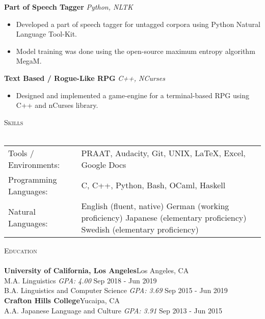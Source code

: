 \documentclass[]{article}
\newcommand{\lineunder} {
    \vspace*{-8pt} \\
    \hspace*{-18pt} \hrulefill \\
}
\newcommand{\header} [1] {
    {\hspace*{-18pt}\vspace*{6pt} \textsc{#1}}
    \vspace*{-6pt} \lineunder
}
\begin{document}
{\textbf{Part of Speech Tagger}} \hspace*{5mm} {\sl Python, NLTK} \\
\vspace*{-5pt}\begin{itemize}	\itemsep 0pt
	\item Developed a part of speech tagger for untagged corpora using Python Natural Language Tool-Kit.
	\item Model training was done using the open-source maximum entropy algorithm MegaM.
\end{itemize}
\vspace*{0mm}
{\textbf{Text Based / Rogue-Like RPG}} \hspace*{5mm} {\sl C++, NCurses} \\
\vspace*{-5pt}\begin{itemize}	\itemsep 0pt
	\item Designed and implemented a game-engine for a terminal-based RPG using C++ and nCurses library.
\end{itemize}
\vspace*{0mm}

\header{Skills}
\begin{tabular}{ l p{11.2cm} }
	Tools / Environments:  & PRAAT, Audacity, Git, UNIX, \LaTeX, Excel, Google Docs
	\\
	Programming Languages: & C, C++, Python, Bash, OCaml, Haskell
	\\
	Natural Languages:     & English \hfill (fluent, native) \newline German \hfill (working proficiency) \newline Japanese \hfill (elementary proficiency) \newline Swedish \hfill (elementary proficiency)
	\\
\end{tabular}
\vspace{2mm}


\header{Education}
\textbf{University of California, Los Angeles}\hfill Los Angeles, CA\\
M.A. Linguistics \hspace*{36mm} \textit{GPA: 4.00} \hfill Sep 2018 - Jun 2019\\
\vspace{1mm}
B.A. Linguistics and Computer Science \hspace*{1mm} \textit{GPA: 3.69} \hfill Sep 2015 - Jun 2019\\
\vspace{1mm}
\textbf{Crafton Hills College}\hfill Yucaipa, CA\\
A.A. Japanese Language and Culture \hspace*{3.8mm} \textit{GPA: 3.91} \hfill Sep 2013 - Jun 2015\\
\vspace{1mm}
\end{document}
